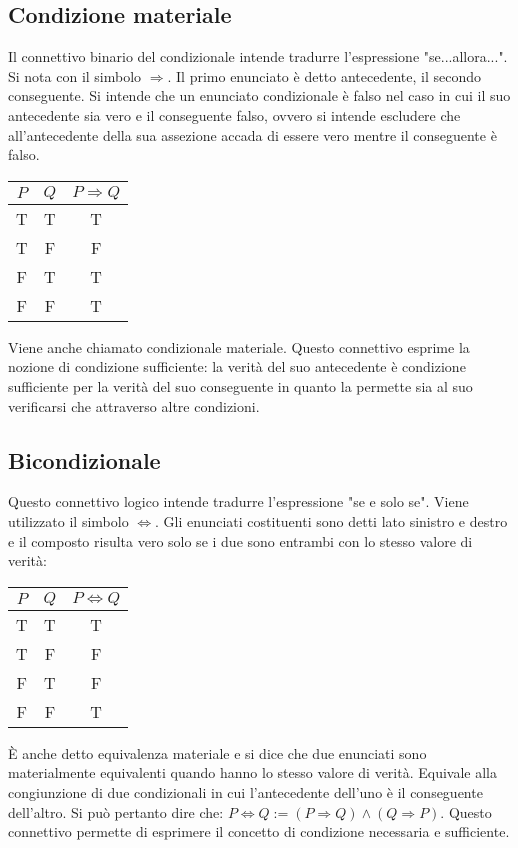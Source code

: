 \subsection{Condizione materiale}
Il connettivo binario del condizionale intende tradurre l'espressione "se...allora...". Si nota con il simbolo $\Rightarrow$. Il primo enunciato \`e detto antecedente, il secondo conseguente. Si intende che un 
enunciato condizionale \`e falso nel caso in cui il suo antecedente sia vero e il conseguente falso, ovvero si intende escludere che all'antecedente della sua assezione accada di essere vero mentre il conseguente 
\`e falso.
\begin{tabular}{|c|c|c|}
\hline
$P$ & $Q$ & $P\Rightarrow Q$\\
\hline
T & T & T \\
\hline
T & F & F \\
\hline
F & T & T \\
\hline
F & F & T \\
\hline
\end{tabular}
Viene anche chiamato condizionale materiale. Questo connettivo esprime la nozione di condizione sufficiente: la verit\`a del suo antecedente \`e condizione sufficiente per la verit\`a del suo conseguente in 
quanto la permette sia al suo verificarsi che attraverso altre condizioni. 
\subsection{Bicondizionale}
Questo connettivo logico intende tradurre l'espressione "se e solo se". Viene utilizzato il simbolo $\Leftrightarrow$. Gli enunciati costituenti sono detti lato sinistro e destro e il composto risulta vero solo se i 
due sono entrambi con lo stesso valore di verit\`a:
\begin{tabular}{|c|c|c|}
\hline
$P$ & $Q$ & $P\Leftrightarrow Q$\\
\hline
T & T & T \\
\hline
T & F & F \\
\hline
F & T & F \\
\hline
F & F & T \\
\hline
\end{tabular}
\`E anche detto equivalenza materiale e si dice che due enunciati sono materialmente equivalenti quando hanno lo stesso valore di verit\`a. Equivale alla congiunzione di due condizionali in cui l'antecedente 
dell'uno \`e il conseguente dell'altro. Si pu\`o pertanto dire che: $P\Leftrightarrow Q:=(P\Rightarrow Q)\land (Q\Rightarrow P)$. Questo connettivo permette di esprimere il concetto di condizione necessaria e 
sufficiente.
